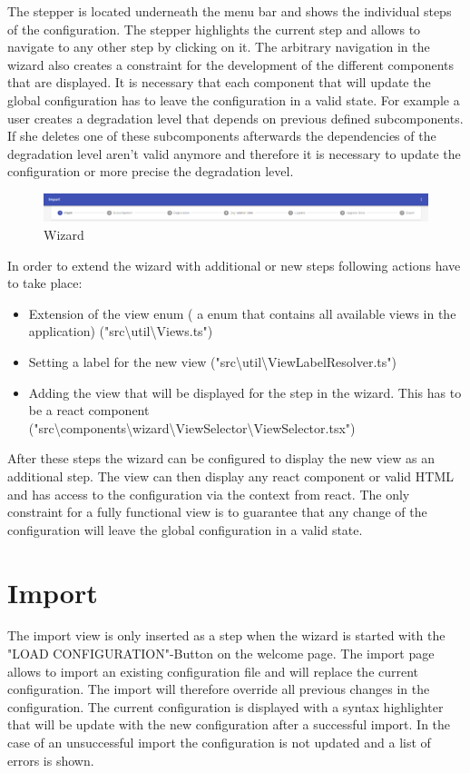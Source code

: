 The stepper is located underneath the menu bar and shows the individual steps of the configuration. The stepper highlights the current step and allows to navigate to any other step by clicking on it. The arbitrary navigation in the wizard also creates a constraint for the development of the different components that are displayed. It is necessary that each component that will update the global configuration has to leave the configuration in a valid state. For example a user creates a degradation level that depends on previous defined subcomponents. If she deletes one of these subcomponents afterwards the dependencies of the degradation level aren't valid anymore and therefore it is necessary to update the configuration or more precise the degradation level. 

\begin{figure}[ht]
    \centering
    \includegraphics[width=\textwidth]{img/wizard.png}
    \caption{Wizard}
    \label{fig:wizard}
\end{figure}

\noindent In order to extend the wizard with additional or new steps following actions have to take place:

\begin{itemize}
    \item Extension of the view enum ( a enum that contains all available views in the application) ("src\textbackslash util\textbackslash Views.ts")
    \item Setting a label for the new view ("src\textbackslash util\textbackslash ViewLabelResolver.ts")
    \item Adding the view that will be displayed for the step in the wizard. This has to be a react component ("src\textbackslash components\textbackslash wizard\textbackslash ViewSelector\textbackslash ViewSelector.tsx")
\end{itemize}

\noindent After these steps the wizard can be configured to display the new view as an additional step. The view can then display any react component or valid HTML and has access to the configuration via the context from react. The only constraint for a fully functional view is to guarantee that any change of the configuration will leave the global configuration in a valid state.

\section{Import}
The import view is only inserted as a step when the wizard is started with the "LOAD CONFIGURATION"-Button on the welcome page. The import page allows to import an existing configuration file and will replace the current configuration. The import will therefore override all previous changes in the configuration. The current configuration is displayed with a syntax highlighter that will be update with the new configuration after a successful import. In the case of an unsuccessful import the configuration is not updated and a list of errors is shown.

